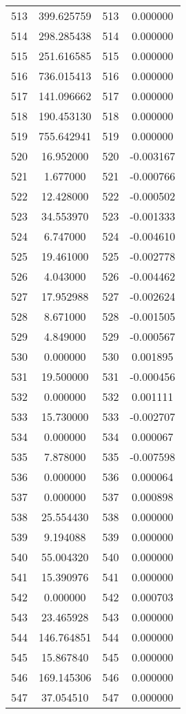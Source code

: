 \documentclass[12pt]{article}
\begin{document}
\begin{longtable}{@{}cccc@{}}
513 & 399.625759 & 513 & 0.000000 \\
514 & 298.285438 & 514 & 0.000000 \\
515 & 251.616585 & 515 & 0.000000 \\
516 & 736.015413 & 516 & 0.000000 \\
517 & 141.096662 & 517 & 0.000000 \\
518 & 190.453130 & 518 & 0.000000 \\
519 & 755.642941 & 519 & 0.000000 \\
520 & 16.952000 & 520 & -0.003167 \\
521 & 1.677000 & 521 & -0.000766 \\
522 & 12.428000 & 522 & -0.000502 \\
523 & 34.553970 & 523 & -0.001333 \\
524 & 6.747000 & 524 & -0.004610 \\
525 & 19.461000 & 525 & -0.002778 \\
526 & 4.043000 & 526 & -0.004462 \\
527 & 17.952988 & 527 & -0.002624 \\
528 & 8.671000 & 528 & -0.001505 \\
529 & 4.849000 & 529 & -0.000567 \\
530 & 0.000000 & 530 & 0.001895 \\
531 & 19.500000 & 531 & -0.000456 \\
532 & 0.000000 & 532 & 0.001111 \\
533 & 15.730000 & 533 & -0.002707 \\
534 & 0.000000 & 534 & 0.000067 \\
535 & 7.878000 & 535 & -0.007598 \\
536 & 0.000000 & 536 & 0.000064 \\
537 & 0.000000 & 537 & 0.000898 \\
538 & 25.554430 & 538 & 0.000000 \\
539 & 9.194088 & 539 & 0.000000 \\
540 & 55.004320 & 540 & 0.000000 \\
541 & 15.390976 & 541 & 0.000000 \\
542 & 0.000000 & 542 & 0.000703 \\
543 & 23.465928 & 543 & 0.000000 \\
544 & 146.764851 & 544 & 0.000000 \\
545 & 15.867840 & 545 & 0.000000 \\
546 & 169.145306 & 546 & 0.000000 \\
547 & 37.054510 & 547 & 0.000000 \\

\end{longtable}
\end{document}
